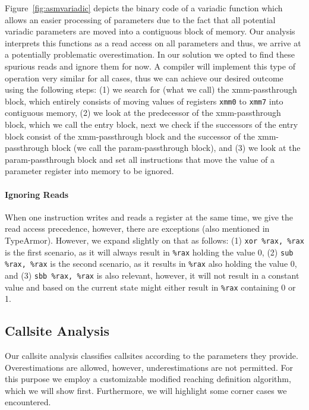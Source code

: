 Figure~\ref{fig:asmvariadic} depicts the binary code of a variadic function which allows an easier processing of parameters
due to the fact that all potential variadic parameters are moved into a contiguous block of memory.
Our analysis interprets this functions as a read access on all parameters and thus, we arrive at a potentially problematic overestimation. 
In our solution we opted to find these spurious reads and ignore them for now. A compiler will implement this type of operation very 
similar for all cases, thus we can achieve our desired outcome using the following steps:
(1) we search for (what we call) the xmm-passthrough block, which entirely consists of moving values of registers \texttt{xmm0} to \texttt{xmm7} into
contiguous memory, %
(2) we look at the predecessor of the xmm-passthrough block, which we call the entry block, next we %
check if the successors of the entry block consist of the xmm-passthrough block and the successor of the xmm-passthrough block (we call the param-passthrough block), and
(3) we look at the param-passthrough block and set all instructions that move the value of a parameter register into memory to be ignored. 

\paragraph{Ignoring Reads} When one instruction writes and reads a register at the same time, we give the read access precedence, however, there 
are exceptions (also mentioned in TypeArmor). However, we expand slightly on that as follows:
(1) \texttt{xor \%rax, \%rax} is the first scenario, as it will always result in \texttt{\%rax} holding the value 0,
(2) \texttt{sub \%rax, \%rax} is the second scenario, as it results in \texttt{\%rax} also holding the value 0, and
(3) \texttt{sbb \%rax, \%rax} is also relevant, however, it will not result in a constant value and based on the current state might either result in \texttt{\%rax} containing 0 or 1.

\subsection{Callsite Analysis}
\label{section:callsiteanalysis}
Our callsite analysis classifies callsites according to the parameters they provide. Overestimations are allowed, however,
underestimations are not permitted. For this purpose we employ a customizable modified reaching definition algorithm, 
which we will show first. Furthermore, we will highlight some corner cases we encountered.

